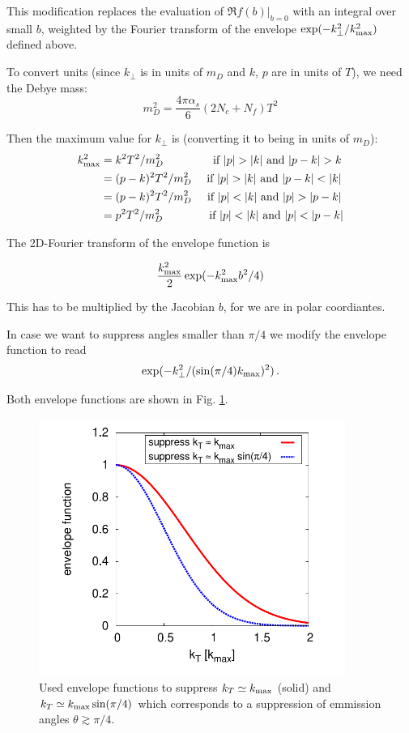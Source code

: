 This modification replaces the evaluation of $\Re f(b)|_{b=0}$ with an
integral over small $b$, weighted by the Fourier transform of the
envelope $\exp(-k_\perp^2/k_{\rm max}^2)$ defined above.

To convert units (since $k_\perp$ is in units of $m_D$ and $k$, $p$ are in units of $T$), we need the Debye mass:
\begin{equation}
  m_D^2 =  \frac{4 \pi \alpha_s}{6} ( 2 N_c + N_f ) T^2
\end{equation}

Then the maximum value for $k_\perp$ is (converting it to being in units of $m_D$):
\begin{align}
  k_{\rm max}^2 &= k^2 T^2/m_D^2 &~\text{if}~ |p|>|k| ~\text{and}~ |p-k|>k \,\\
  &=(p-k)^2 T^2/m_D^2 &~\text{if}~ |p|>|k| ~\text{and}~ |p-k|<|k| \,\\
  &=(p-k)^2 T^2/m_D^2 &~\text{if}~ |p|<|k| ~\text{and}~ |p|>|p-k| \,\\
  &=p^2 T^2/m_D^2 &~\text{if}~ |p|<|k| ~\text{and}~ |p|<|p-k|
\end{align}

The 2D-Fourier transform of the envelope function is

\begin{equation}
  \frac{k_{\rm max}^2}{2} \exp(-k_{\rm max}^2 b^2/4)
\end{equation}

This has to be multiplied by the Jacobian $b$, for we are in 
polar coordiantes.

In case we want to suppress angles smaller than $\pi/4$ we modify the envelope function to read
\begin{equation}
  \exp(-k_\perp^2/(\sin(\pi/4)k_{\rm max})^2)\,.
\end{equation}

Both envelope functions are shown in Fig. \ref{fig:envelope}.

\begin{figure}[htb]
  \begin{center}
    \includegraphics[width=10cm]{envelope}
    \caption{Used envelope functions to suppress $k_T\simeq k_{\rm max}$ (solid) and $k_T\simeq k_{\rm max} \sin(\pi/4)$
     which corresponds to a suppression of emmission angles $\theta \gtrsim \pi/4$. \label{fig:envelope}}
  \end{center}
\end{figure}


